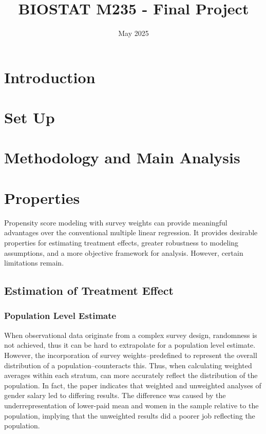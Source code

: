 \documentclass[12pt]{article}
\title{BIOSTAT M235 - Final Project}
\author{}
\date{May 2025}
\begin{document}
\doublespacing


\maketitle

\section{Introduction}

\section{Set Up}

\section{Methodology and Main Analysis}

\section{Properties}

Propensity score modeling with survey weights can provide meaningful advantages over the conventional multiple linear regression. It provides desirable properties for estimating treatment effects, greater robustness to modeling assumptions, and a more objective framework for analysis. However, certain limitations remain.

\subsection{Estimation of Treatment Effect} 

\subsubsection{Population Level Estimate}

When observational data originate from a complex survey design, randomness is not achieved, thus it can be hard to extrapolate for a population level estimate. However, the incorporation of survey weights--predefined to represent the overall distribution of a population--counteracts this. Thus, when calculating weighted averages within each stratum, can more accurately reflect the distribution of the population. In fact, the paper indicates that weighted and unweighted analyses of gender salary led to differing results. The difference was caused by the underrepresentation of lower-paid mean and women in the sample relative to the population, implying that the unweighted results did a poorer job reflecting the population.
\end{document}
